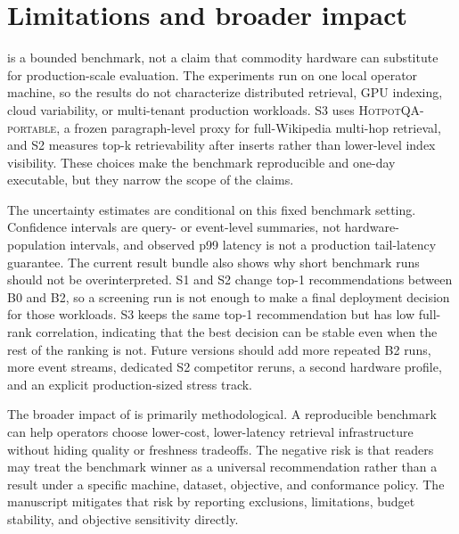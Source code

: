 \section{Limitations and broader impact}

\sys is a bounded benchmark, not a claim that commodity hardware can substitute for production-scale evaluation. The experiments run on one local operator machine, so the results do not characterize distributed retrieval, GPU indexing, cloud variability, or multi-tenant production workloads. S3 uses \textsc{HotpotQA-portable}, a frozen paragraph-level proxy for full-Wikipedia multi-hop retrieval, and S2 measures top-k retrievability after inserts rather than lower-level index visibility. These choices make the benchmark reproducible and one-day executable, but they narrow the scope of the claims.

The uncertainty estimates are conditional on this fixed benchmark setting. Confidence intervals are query- or event-level summaries, not hardware-population intervals, and observed p99 latency is not a production tail-latency guarantee. The current result bundle also shows why short benchmark runs should not be overinterpreted. S1 and S2 change top-1 recommendations between B0 and B2, so a screening run is not enough to make a final deployment decision for those workloads. S3 keeps the same top-1 recommendation but has low full-rank correlation, indicating that the best decision can be stable even when the rest of the ranking is not. Future versions should add more repeated B2 runs, more event streams, dedicated S2 competitor reruns, a second hardware profile, and an explicit production-sized stress track.

The broader impact of \sys is primarily methodological. A reproducible benchmark can help operators choose lower-cost, lower-latency retrieval infrastructure without hiding quality or freshness tradeoffs. The negative risk is that readers may treat the benchmark winner as a universal recommendation rather than a result under a specific machine, dataset, objective, and conformance policy. The manuscript mitigates that risk by reporting exclusions, limitations, budget stability, and objective sensitivity directly.
